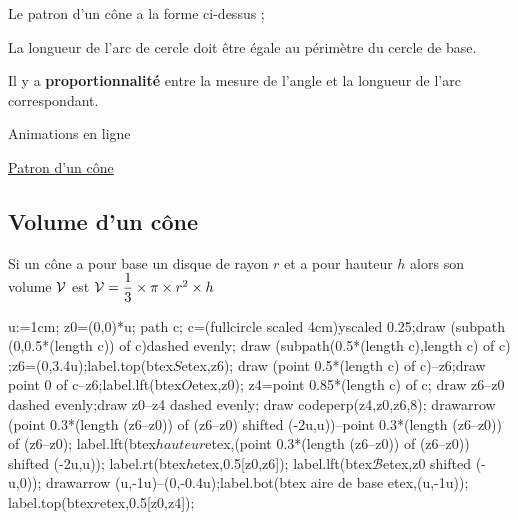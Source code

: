 \begin{center}
    Le patron d'un cône a la forme ci-dessus ;
    
    La longueur de l'arc de cercle doit être égale au périmètre du cercle de base.
    
    Il y a {\bf proportionnalité} entre la mesure de l'angle et la longueur de l'arc correspondant.
\end{center}
\begin{center}
    \begin{myBox}{  Animations en ligne}
        \begin{flushleft}        
            \href{https://www.geogebra.org/classic/jvvsa5ea}{ Patron d'un cône}
        \end{flushleft}
    
    \end{myBox}
\end{center}
\subsection{Volume d'un cône}
\begin{propriete}[\admise]
    Si un cône a pour base un disque de rayon $r$ et a pour hauteur $h$ alors son volume $\cal V$ est ${\cal V}=\dfrac13\times\pi\times r^2\times h$
\end{propriete}

\begin{center}
    \begin{Geometrie}[CoinBG={(-4u,-2u)}]
        u:=1cm;
        z0=(0,0)*u;
        path c;
        c=(fullcircle scaled 4cm)yscaled 0.25;draw  (subpath (0,0.5*(length c)) of c)dashed evenly;
        draw (subpath(0.5*(length c),length c) of c)  ;z6=(0,3.4u);label.top(btex$S$etex,z6);
        draw (point 0.5*(length c) of c)--z6;draw point 0 of c--z6;label.lft(btex$O$etex,z0);
        z4=point 0.85*(length c) of c;
        draw z6--z0 dashed evenly;draw z0--z4 dashed evenly; draw codeperp(z4,z0,z6,8);
        drawarrow (point 0.3*(length (z6--z0)) of (z6--z0) shifted (-2u,u))--point 0.3*(length (z6--z0)) of (z6--z0);
        label.lft(btex$ hauteur$etex,(point 0.3*(length (z6--z0)) of (z6--z0)) shifted (-2u,u));
        label.rt(btex$h$etex,0.5[z0,z6]);
        label.lft(btex$\mathcal{B}$etex,z0 shifted (-u,0));
        drawarrow (u,-1u)--(0,-0.4u);label.bot(btex aire de base etex,(u,-1u));
        label.top(btex$r$etex,0.5[z0,z4]);
    \end{Geometrie}
\end{center}